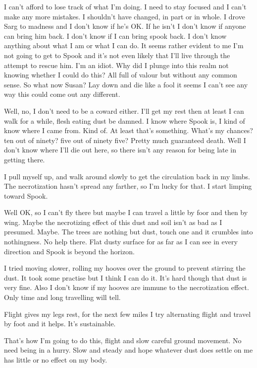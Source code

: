 
I can't afford to lose track of what I'm doing. I need to stay focused and I can't make any more mistakes. I shouldn't have changed, in part or in whole. I drove Sarg to madness and I don't know if he's OK. If he isn't I don't know if anyone can bring him back. I don't know if I can bring spook back. I don't know anything about what I am or what I can do. It seems rather evident to me I'm not going to get to Spook and it's not even likely that I'll live through the attempt to rescue him. I'm an idiot. Why did I plunge into this realm not knowing whether I could do this? All full of valour but without any common sense. So what now Susan? Lay down and die like a fool it seems I can't see any way this could come out any different.

Well, no, I don't need to be a coward either. I'll get my rest then at least I can walk for a while, flesh eating dust be damned. I know where Spook is, I kind of know where I came from. Kind of. At least that's something. What's my chances? ten out of ninety? five out of ninety five? Pretty much guaranteed death. Well I don't know where I'll die out here, so there isn't any reason for being late in getting there.

I pull myself up, and walk around slowly to get the circulation back in my limbs. The necrotization hasn't spread any farther, so I'm lucky for that. I start limping toward Spook.

Well OK, so I can't fly there but maybe I can travel a little by foor and then by wing. Maybe the necrotizing effect of this dust and soil isn't as bad as I presumed. Maybe. The trees are nothing but dust, touch one and it crumbles into nothingness. No help there. Flat dusty surface for as far as I can see in every direction and Spook is beyond the horizon.

I tried moving slower, rolling my hooves over the ground to prevent stirring the dust. It took some practise but I think I can do it. It's hard though that dust is very fine. Also I don't know if my hooves are immune to the necrotization effect. Only time and long travelling will tell.

Flight gives my legs rest, for the next few miles I try alternating flight and travel by foot and it helps. It's sustainable.

That's how I'm going to do this, flight and slow careful ground movement. No need being in a hurry. Slow and steady and hope whatever dust does settle on me has little or no effect on my body.

